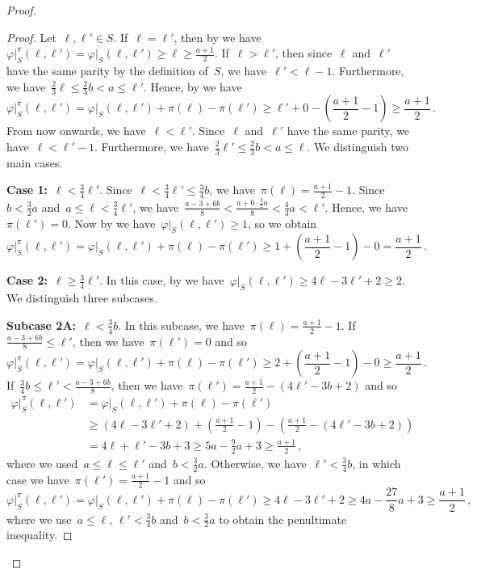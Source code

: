 \documentclass[12pt]{article}
\theoremstyle{plain}
\theoremstyle{definition}
\newcommand{\oldqed}{}
\def\endofClaim{\hfill\scalebox{.6}{$\Box$}}
\newenvironment{claimproof}[1][Proof]{
	\renewcommand{\oldqed}{\qedsymbol}
	\renewcommand{\qedsymbol}{\endofClaim}
	\begin{proof}[#1]
	}{
	\end{proof}
	\renewcommand{\qedsymbol}{\oldqed}
}
\newcommand{\f}{\varphi}
\newcommand{\w}{\f\vert_S}
\begin{document}
\begin{proof}
\begin{claimproof}
			Let~$\ell,\ell'\in S$. If~$\ell=\ell'$, then by  we have~$\w^{\pi}(\ell,\ell')=\w(\ell,\ell')\ge \ell \ge\frac{a+1}{2}$. If~$\ell>\ell'$, then since~$\ell$ and~$\ell'$ have the same parity by the definition of~$S$, we have~$\ell'<\ell-1$. Furthermore, we have~$\frac{2}{3}\ell\le\frac{2}{3}b<a\le \ell'$. Hence, by  we have
			\[ \w^\pi(\ell,\ell') = \w(\ell,\ell')+\pi(\ell)-\pi(\ell') \ge \ell'+0-\left(\frac{a+1}{2}-1\right) \ge \frac{a+1}{2}\,.\]
			From now onwards, we have~$\ell<\ell'$. Since~$\ell$ and~$\ell'$ have the same parity, we have~$\ell<\ell'-1$. Furthermore, we have~$\frac{2}{3}\ell'\le\frac{2}{3}b<a\le\ell$. We distinguish two main cases.
			
			\textbf{Case 1:}~$\ell<\frac{3}{4}\ell'$. Since~$\ell<\frac{3}{4}\ell'\le\frac{3}{4}b$, we have~$\pi(\ell)=\frac{a+1}{2}-1$. Since~$b<\frac{3}{2}a$ and~$a\le\ell<\frac{3}{4}\ell'$, we have~$\frac{a-3+6b}{8} <\frac{a+6\cdot\frac{3}{2}a}{8}<\frac{4}{3}a<\ell'$. Hence, we have~$\pi(\ell')=0$. Now by  we have~$\w(\ell,\ell')\ge1$, so we obtain
			\[ \w^\pi(\ell,\ell') = \w(\ell,\ell') + \pi(\ell) - \pi(\ell') \ge 1 + \left(\frac{a+1}{2} - 1\right) - 0 =\frac{a+1}{2}\,. \]
			
			\textbf{Case 2:}~$\ell\ge\frac{3}{4}\ell'$. In this case, by  we have~$\w(\ell,\ell')\ge 4\ell-3\ell'+2\ge 2$. We distinguish three subcases.
			
			\textbf{Subcase 2A:}~$\ell<\frac{3}{4}b$. In this subcase, we have~$\pi(\ell)=\frac{a+1}{2}-1$. If~$\frac{a-3+6b}{8}\le\ell'$, then we have~$\pi(\ell')=0$ and so
			\[ \w^\pi(\ell,\ell')=\w(\ell,\ell')+\pi(\ell)-\pi(\ell')\ge 2+\left(\frac{a+1}{2}-1\right)-0\ge\frac{a+1}{2}\,. \]
			If~$\frac{3}{4}b\le\ell'<\frac{a-3+6b}{8}$, then we have~$\pi(\ell')=\frac{a+1}{2}-(4\ell'-3b+2)$ and so
			\begin{align*}
				\w^\pi(\ell,\ell') &= \w(\ell,\ell')+\pi(\ell)-\pi(\ell') \\
				&\ge (4\ell-3\ell'+2)+\left(\frac{a+1}{2}-1\right)-\left(\frac{a+1}{2}-(4\ell'-3b+2)\right)\\
				&=4\ell+\ell'-3b+3\ge5a-\frac{9}{2}a+3\ge\frac{a+1}{2}\,,
			\end{align*}
			where we used~$a\le\ell\le\ell'$ and~$b<\frac{3}{2}a$. Otherwise, we have~$\ell'<\frac{3}{4}b$, in which case we have~$\pi(\ell')=\frac{a+1}{2}-1$ and so
			\[ \w^\pi(\ell,\ell') = \w(\ell,\ell')+\pi(\ell)-\pi(\ell') \ge 4\ell-3\ell'+2 \ge 4a-\frac{27}{8}a +3 \ge\frac{a+1}{2}\,,\]
			where we use~$a\le\ell$, $\ell'<\frac{3}{4}b$ and~$b<\frac{3}{2}a$ to obtain the penultimate inequality.
			

\end{claimproof}
\end{proof}
\end{document}
